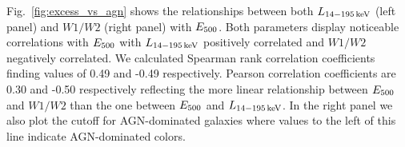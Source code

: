 Fig.~\ref{fig:excess_vs_agn} shows the relationships between both $L_{\rm 14-195\,keV}$ (left panel) and $W1/W2$ (right panel) with $E_{\rm 500}$. Both parameters display noticeable correlations with $E_{\rm 500}$ with $L_{\rm 14-195\,keV}$ positively correlated and $W1/W2$ negatively correlated. We calculated Spearman rank correlation coefficients finding values of 0.49 and -0.49 respectively. Pearson correlation coefficients are 0.30 and -0.50 respectively reflecting the more linear relationship between $E_{\rm 500}$ and $W1/W2$ than the one between $E_{\rm 500}$ and $L_{\rm 14-195\,keV}$. In the right panel we also plot the \citet{Stern:2012mz} cutoff for AGN-dominated galaxies where values to the left of this line indicate AGN-dominated colors.